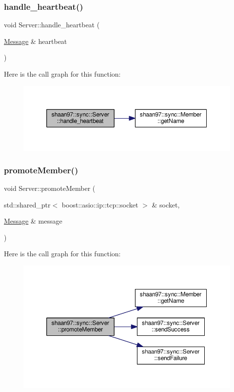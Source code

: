 \subsubsection{\texorpdfstring{handle\+\_\+heartbeat()}{handle\_heartbeat()}}
{\footnotesize\ttfamily void Server\+::handle\+\_\+heartbeat (\begin{DoxyParamCaption}\item[{\hyperlink{structshaan97_1_1sync_1_1_message}{Message} \&}]{heartbeat }\end{DoxyParamCaption})\hspace{0.3cm}{\ttfamily [private]}}

Here is the call graph for this function\+:\nopagebreak
\begin{figure}[H]
\begin{center}
\leavevmode
\includegraphics[width=350pt]{group___message_handling_ga56230c5225416d342206232d3f2b8f6e_cgraph}
\end{center}
\end{figure}
\mbox{\label{group___message_handling_ga46e08d6ffcd45a73aac315e8393e0228}} 
\subsubsection{\texorpdfstring{promote\+Member()}{promoteMember()}}
{\footnotesize\ttfamily void Server\+::promote\+Member (\begin{DoxyParamCaption}\item[{std\+::shared\+\_\+ptr$<$ boost\+::asio\+::ip\+::tcp\+::socket $>$ \&}]{socket,  }\item[{\hyperlink{structshaan97_1_1sync_1_1_message}{Message} \&}]{message }\end{DoxyParamCaption})\hspace{0.3cm}{\ttfamily [private]}}

Here is the call graph for this function\+:\nopagebreak
\begin{figure}[H]
\begin{center}
\leavevmode
\includegraphics[width=350pt]{group___message_handling_ga46e08d6ffcd45a73aac315e8393e0228_cgraph}
\end{center}
\end{figure}
